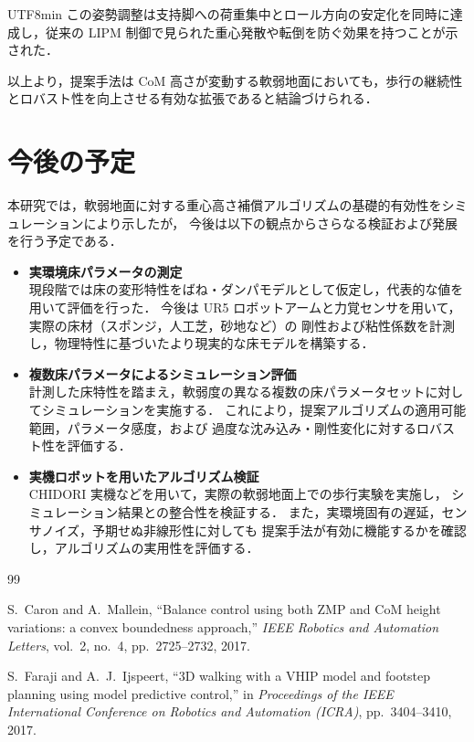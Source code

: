 \documentclass[a4paper,11pt]{report}
\begin{document}
\begin{CJK}{UTF8}{min}
この姿勢調整は支持脚への荷重集中とロール方向の安定化を同時に達成し，従来の LIPM 制御で見られた重心発散や転倒を防ぐ効果を持つことが示された．

以上より，提案手法は CoM 高さが変動する軟弱地面においても，歩行の継続性とロバスト性を向上させる有効な拡張であると結論づけられる．

\section{今後の予定}
本研究では，軟弱地面に対する重心高さ補償アルゴリズムの基礎的有効性をシミュレーションにより示したが，
今後は以下の観点からさらなる検証および発展を行う予定である．

\begin{itemize}
  \item \textbf{実環境床パラメータの測定}\\
  現段階では床の変形特性をばね・ダンパモデルとして仮定し，代表的な値を用いて評価を行った．
  今後は UR5 ロボットアームと力覚センサを用いて，実際の床材（スポンジ，人工芝，砂地など）の
  剛性および粘性係数を計測し，物理特性に基づいたより現実的な床モデルを構築する．

  \item \textbf{複数床パラメータによるシミュレーション評価}\\
  計測した床特性を踏まえ，軟弱度の異なる複数の床パラメータセットに対してシミュレーションを実施する．
  これにより，提案アルゴリズムの適用可能範囲，パラメータ感度，および
  過度な沈み込み・剛性変化に対するロバスト性を評価する．

  \item \textbf{実機ロボットを用いたアルゴリズム検証}\\
  CHIDORI 実機などを用いて，実際の軟弱地面上での歩行実験を実施し，
  シミュレーション結果との整合性を検証する．
  また，実環境固有の遅延，センサノイズ，予期せぬ非線形性に対しても
  提案手法が有効に機能するかを確認し，アルゴリズムの実用性を評価する．
\end{itemize}


\appendix
\begin{thebibliography}{99}

S.~Caron and A.~Mallein,
``Balance control using both ZMP and CoM height variations: a convex boundedness approach,''
\textit{IEEE Robotics and Automation Letters}, vol.~2, no.~4, pp.~2725--2732, 2017.

S.~Faraji and A.~J.~Ijspeert,
``3D walking with a VHIP model and footstep planning using model predictive control,''
in \textit{Proceedings of the IEEE International Conference on Robotics and Automation (ICRA)}, 
pp.~3404--3410, 2017.


\end{thebibliography}
\end{CJK}
\end{document}

